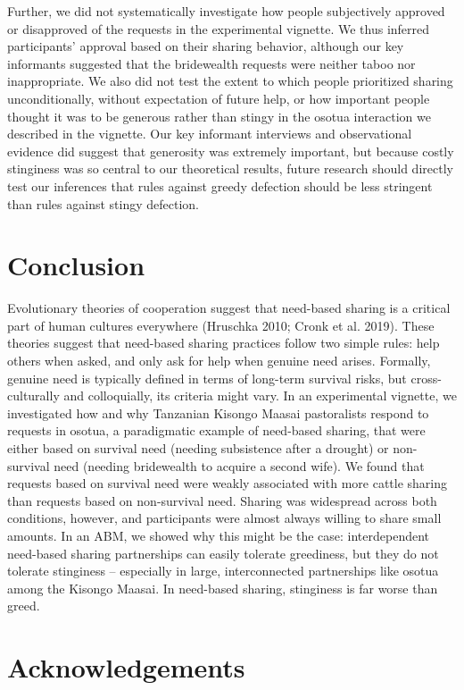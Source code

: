\documentclass[
]{article}
\begin{document}
Further, we did not systematically investigate how people subjectively approved or disapproved of the requests in the experimental vignette. We thus inferred participants' approval based on their sharing behavior, although our key informants suggested that the bridewealth requests were neither taboo nor inappropriate. We also did not test the extent to which people prioritized sharing unconditionally, without expectation of future help, or how important people thought it was to be generous rather than stingy in the osotua interaction we described in the vignette. Our key informant interviews and observational evidence did suggest that generosity was extremely important, but because costly stinginess was so central to our theoretical results, future research should directly test our inferences that rules against greedy defection should be less stringent than rules against stingy defection.

\section{Conclusion}

Evolutionary theories of cooperation suggest that need-based sharing is a critical part of human cultures everywhere (Hruschka 2010; Cronk et al. 2019). These theories suggest that need-based sharing practices follow two simple rules: help others when asked, and only ask for help when genuine need arises. Formally, genuine need is typically defined in terms of long-term survival risks, but cross-culturally and colloquially, its criteria might vary. In an experimental vignette, we investigated how and why Tanzanian Kisongo Maasai pastoralists respond to requests in osotua, a paradigmatic example of need-based sharing, that were either based on survival need (needing subsistence after a drought) or non-survival need (needing bridewealth to acquire a second wife). We found that requests based on survival need were weakly associated with more cattle sharing than requests based on non-survival need. Sharing was widespread across both conditions, however, and participants were almost always willing to share small amounts. In an ABM, we showed why this might be the case: interdependent need-based sharing partnerships can easily tolerate greediness, but they do not tolerate stinginess -- especially in large, interconnected partnerships like osotua among the Kisongo Maasai. In need-based sharing, stinginess is far worse than greed.

\section*{Acknowledgements}
\end{document}
